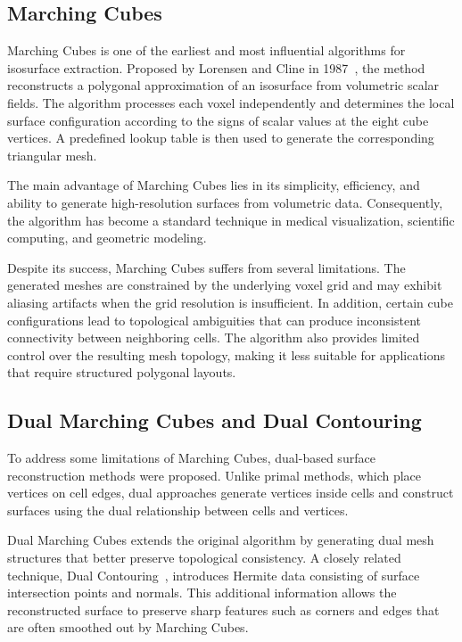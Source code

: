 \documentclass[../main.tex]{subfiles}
\begin{document}
\subsection{Marching Cubes}

Marching Cubes is one of the earliest and most influential algorithms for isosurface extraction. Proposed by Lorensen and Cline in 1987~\cite{lorensen1987marching}, the method reconstructs a polygonal approximation of an isosurface from volumetric scalar fields. The algorithm processes each voxel independently and determines the local surface configuration according to the signs of scalar values at the eight cube vertices. A predefined lookup table is then used to generate the corresponding triangular mesh.

The main advantage of Marching Cubes lies in its simplicity, efficiency, and ability to generate high-resolution surfaces from volumetric data. Consequently, the algorithm has become a standard technique in medical visualization, scientific computing, and geometric modeling.

Despite its success, Marching Cubes suffers from several limitations. The generated meshes are constrained by the underlying voxel grid and may exhibit aliasing artifacts when the grid resolution is insufficient. In addition, certain cube configurations lead to topological ambiguities that can produce inconsistent connectivity between neighboring cells. The algorithm also provides limited control over the resulting mesh topology, making it less suitable for applications that require structured polygonal layouts.

\subsection{Dual Marching Cubes and Dual Contouring}

To address some limitations of Marching Cubes, dual-based surface reconstruction methods were proposed. Unlike primal methods, which place vertices on cell edges, dual approaches generate vertices inside cells and construct surfaces using the dual relationship between cells and vertices.

Dual Marching Cubes extends the original algorithm by generating dual mesh structures that better preserve topological consistency. A closely related technique, Dual Contouring~\cite{nieBleszinski2002dualcontouring}, introduces Hermite data consisting of surface intersection points and normals. This additional information allows the reconstructed surface to preserve sharp features such as corners and edges that are often smoothed out by Marching Cubes.
\end{document}
